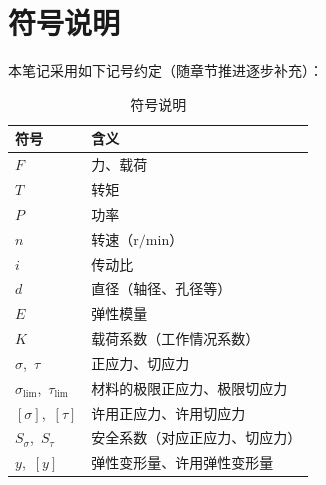 \section{符号说明}
\label{sec:符号说明}

本笔记采用如下记号约定（随章节推进逐步补充）：

\begin{table}[H]
\centering
\caption{符号说明}
\label{tab:符号说明}
\begin{tabular}{ll}
\toprule
符号 & 含义 \\
\midrule
$F$ & 力、载荷 \\
$T$ & 转矩 \\
$P$ & 功率 \\
$n$ & 转速（$\mathrm{r/min}$） \\
$i$ & 传动比 \\
$d$ & 直径（轴径、孔径等） \\
$E$ & 弹性模量 \\
$K$ & 载荷系数（工作情况系数） \\
$\sigma$,\, $\tau$ & 正应力、切应力 \\
$\sigma_{\lim}$,\, $\tau_{\lim}$ & 材料的极限正应力、极限切应力 \\
$[\sigma]$,\, $[\tau]$ & 许用正应力、许用切应力 \\
$S_{\sigma}$,\, $S_{\tau}$ & 安全系数（对应正应力、切应力） \\
$y$,\, $[y]$ & 弹性变形量、许用弹性变形量 \\
\bottomrule
\end{tabular}
\end{table}
